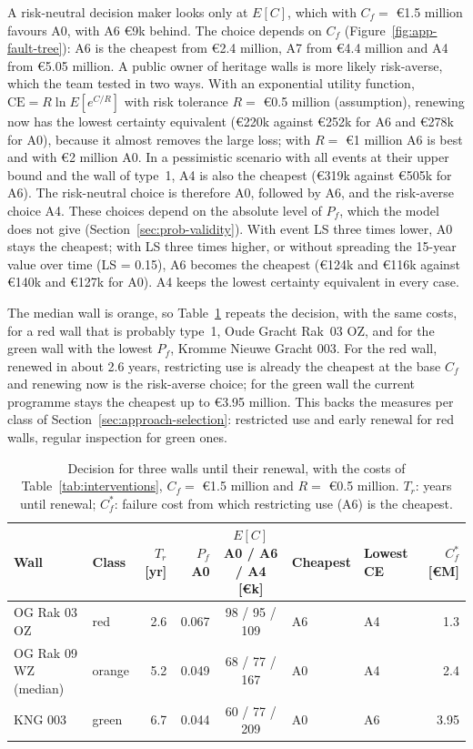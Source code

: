 A risk-neutral decision maker looks only at $E[C]$, which with $C_f = $ \euro1.5 million favours A0, with A6
\euro9k behind. The choice depends on $C_f$ (Figure~\ref{fig:app-fault-tree}): A6 is the cheapest from
\euro2.4 million, A7 from \euro4.4 million and A4 from \euro5.05 million. A public
owner of heritage walls is more likely risk-averse, which the team tested in two
ways. With an exponential utility function,
$\mathrm{CE} = R \ln E[e^{C/R}]$ with risk tolerance $R = $ \euro0.5 million
(assumption), renewing now has the lowest certainty equivalent (\euro220k
against \euro252k for A6 and \euro278k for A0), because it almost removes the
large loss; with $R = $ \euro1 million A6 is best and with \euro2 million A0.
In a pessimistic scenario with all events at their upper bound and the wall of
type~1, A4 is also the cheapest (\euro319k against \euro505k for A6). The
risk-neutral choice is therefore A0, followed by A6, and the risk-averse choice
A4. These choices depend on the absolute level of $P_f$, which the model does
not give (Section~\ref{sec:prob-validity}). With event LS three times lower, A0
stays the cheapest; with LS three times higher, or without spreading the
15-year value over time (LS = 0.15), A6 becomes the cheapest (\euro124k and
\euro116k against \euro140k and \euro127k for A0). A4 keeps the lowest
certainty equivalent in every case.

The median wall is orange, so Table~\ref{tab:walls-decision} repeats the decision, with the same costs, for a red wall that is probably type~1, Oude Gracht Rak~03
OZ, and for the green wall with the lowest $P_f$, Kromme Nieuwe Gracht 003. For
the red wall, renewed in about 2.6 years, restricting use is already the
cheapest at the base $C_f$ and renewing now is the risk-averse choice; for the
green wall the current programme stays the cheapest up to \euro3.95 million.
This backs the measures per class of Section~\ref{sec:approach-selection}:
restricted use and early renewal for red walls, regular inspection for green
ones.

\begin{table}[htbp]
\centering
\small
\caption{Decision for three walls until their renewal, with the costs of
Table~\ref{tab:interventions}, $C_f = $ \euro1.5 million and $R = $ \euro0.5
million. $T_r$: years until renewal; $C_f^{*}$: failure cost from which
restricting use (A6) is the cheapest.}
\label{tab:walls-decision}
\setlength{\tabcolsep}{4pt}
\begin{tabular}{@{}l l r r c l l r@{}}
\toprule
Wall & Class & $T_r$ [yr] & $P_f$ A0 & $E[C]$ A0 / A6 / A4 [\euro k] & Cheapest & Lowest CE & $C_f^{*}$ [\euro M] \\
\midrule
OG Rak 03 OZ & red & 2.6 & 0.067 & 98 / 95 / 109 & A6 & A4 & 1.3 \\
OG Rak 09 WZ (median) & orange & 5.2 & 0.049 & 68 / 77 / 167 & A0 & A4 & 2.4 \\
KNG 003 & green & 6.7 & 0.044 & 60 / 77 / 209 & A0 & A6 & 3.95 \\
\bottomrule
\end{tabular}
\end{table}

